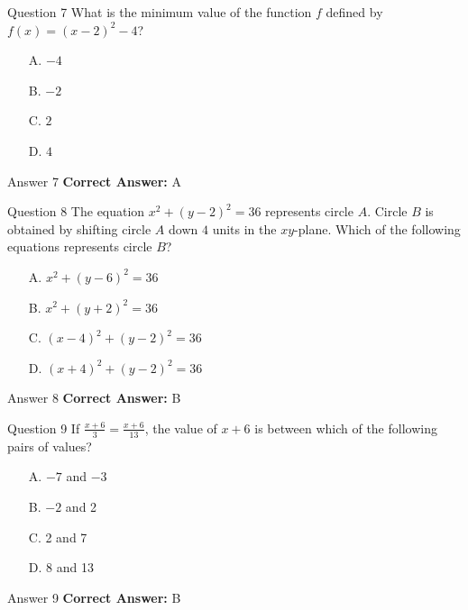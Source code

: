 \documentclass{beamer}
\begin{document}
\begin{frame}{Question 7}
\small
What is the minimum value of the function \(\displaystyle f\) defined by \(\displaystyle f(x) = (x - 2)^2 - 4\)?
\vspace{0.35cm}
\begin{enumerate}
    \item[A.] \(\displaystyle -4\)
    \item[B.] \(\displaystyle -2\)
    \item[C.] \(\displaystyle 2\)
    \item[D.] \(\displaystyle 4\)
\end{enumerate}

\end{frame}
\begin{frame}{Answer 7}
\small
\textbf{Correct Answer:} A
\end{frame}

\begin{frame}{Question 8}
\small
The equation \(\displaystyle x^2 + (y - 2)^2 = 36\) represents circle \(\displaystyle A\). Circle \(\displaystyle B\) is obtained by shifting circle \(\displaystyle A\) down \(\displaystyle 4\) units in the \(\displaystyle xy\)-plane. Which of the following equations represents circle \(\displaystyle B\)?
\vspace{0.35cm}
\begin{enumerate}
    \item[A.] \(\displaystyle x^2 + (y - 6)^2 = 36\)
    \item[B.] \(\displaystyle x^2 + (y + 2)^2 = 36\)
    \item[C.] \(\displaystyle (x - 4)^2 + (y - 2)^2 = 36\)
    \item[D.] \(\displaystyle (x + 4)^2 + (y - 2)^2 = 36\)
\end{enumerate}

\end{frame}
\begin{frame}{Answer 8}
\small
\textbf{Correct Answer:} B
\end{frame}

\begin{frame}{Question 9}
\small
If \( \frac{x + 6}{3} = \frac{x + 6}{13} \), the value of \( x + 6 \) is between which of the following pairs of values?
\vspace{0.35cm}
\begin{enumerate}
    \item[A.] \(-7\) and \(-3\)
    \item[B.] \(-2\) and 2
    \item[C.] 2 and 7
    \item[D.] 8 and 13
\end{enumerate}

\end{frame}
\begin{frame}{Answer 9}
\small
\textbf{Correct Answer:} B
\end{frame}
\end{document}
